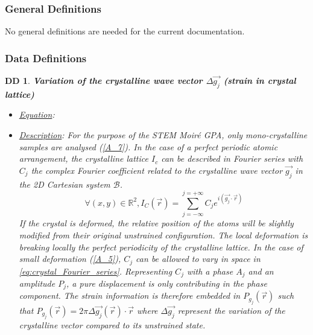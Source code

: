 \documentclass[12pt]{article}
\newtheorem{DD}{DD}
\begin{document}
\subsubsection{General Definitions}\label{sec_gendef}

No general definitions are needed for the current documentation.

\subsubsection{Data Definitions}\label{sec_datadef}

\renewcommand{\labelitemi}{$\star$}

\begin{DD}
\label{DD_1}
\noindent\colorbox{shadecolorDD}{\normalfont \textbf{Variation of the 
crystalline wave vector $\Delta \overrightarrow{g_j}$ (strain in crystal 
lattice)}}
\normalfont
\begin{itemize}
\item \underline{Equation}: 
\item \underline{Description}: For the purpose of the STEM Moir{\'e} GPA, only 
mono-crystalline samples are analysed (\cref{A_7}). In the case of a perfect 
periodic atomic arrangement, the crystalline lattice $I_c$ can be described in 
Fourier series with $C_j$ the complex Fourier coefficient related to the 
crystalline wave vector $\vec{g_j}$ in the 2D Cartesian system $\mathcal{B}$.
\begin{equation}
\forall (x,y) \in 
\mathbb{R}^{2},I_C(\vec{r})=\sum_{j=-\infty}^{j=+\infty}C_je^{i(\vec{g_j}\cdot\vec{r})}
\label{eq:crystal_Fourier_series}
\end{equation}
If the crystal is deformed, the relative position of the atoms will be slightly 
modified from their original unstrained configuration. The local deformation is 
breaking locally the perfect periodicity of the crystalline lattice. In the case 
of small deformation (\cref{A_5}), $C_j$ can be allowed to vary in space in 
\cref{eq:crystal_Fourier_series}. Representing $C_j$ with a phase $A_j$ and an 
amplitude $P_j$, a pure displacement is only contributing in the phase 
component. The strain information is therefore embedded in $P_{g_{j}}(\vec{r})$ 
such that $P_{g_{j}}(\vec{r})=2\pi\Delta 
\overrightarrow{g_{j}}(\vec{r})\cdot\vec{r}$ where $\Delta \overrightarrow{g_j}$ 
represent the variation of the crystalline vector compared to its unstrained 
state.
\begin{equation}
\begin{gathered}

\end{gathered}
\end{equation}
\end{itemize}
\end{DD}
\end{document}
